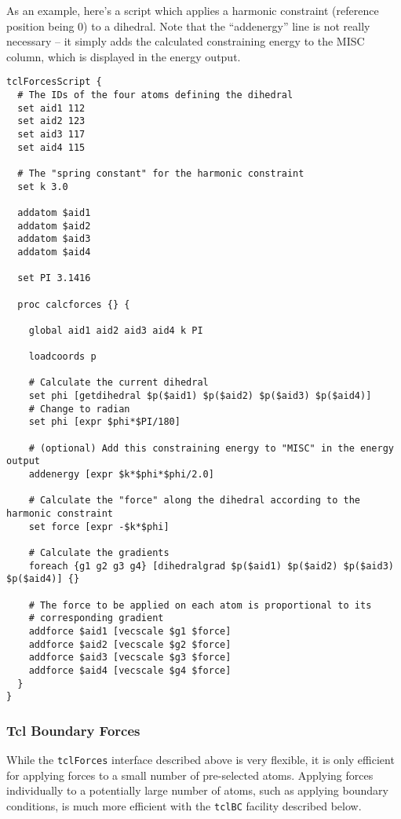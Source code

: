 As an example, here's a script which applies a harmonic
constraint (reference position being 0) to a dihedral. Note that
the ``addenergy'' line is not really necessary -- it simply adds
the calculated constraining energy to the MISC column, which is
displayed in the energy output.

\begin{verbatim}
tclForcesScript {
  # The IDs of the four atoms defining the dihedral
  set aid1 112
  set aid2 123
  set aid3 117
  set aid4 115
  
  # The "spring constant" for the harmonic constraint
  set k 3.0
  
  addatom $aid1
  addatom $aid2
  addatom $aid3
  addatom $aid4
  
  set PI 3.1416
  
  proc calcforces {} {
  
    global aid1 aid2 aid3 aid4 k PI
    
    loadcoords p
    
    # Calculate the current dihedral
    set phi [getdihedral $p($aid1) $p($aid2) $p($aid3) $p($aid4)]
    # Change to radian
    set phi [expr $phi*$PI/180]
    
    # (optional) Add this constraining energy to "MISC" in the energy output
    addenergy [expr $k*$phi*$phi/2.0]
    
    # Calculate the "force" along the dihedral according to the harmonic constraint
    set force [expr -$k*$phi]
    
    # Calculate the gradients
    foreach {g1 g2 g3 g4} [dihedralgrad $p($aid1) $p($aid2) $p($aid3) $p($aid4)] {}
    
    # The force to be applied on each atom is proportional to its
    # corresponding gradient
    addforce $aid1 [vecscale $g1 $force]
    addforce $aid2 [vecscale $g2 $force]
    addforce $aid3 [vecscale $g3 $force]
    addforce $aid4 [vecscale $g4 $force]
  }
}
\end{verbatim}


\subsubsection{Tcl Boundary Forces}
\label{section:tclBC}

While the {\tt tclForces} interface described above is very flexible, it is only
efficient for applying forces to a small number of pre-selected atoms.
Applying forces individually to a potentially large number of atoms, such
as applying boundary conditions, is much more efficient with the {\tt tclBC}
facility described below.

